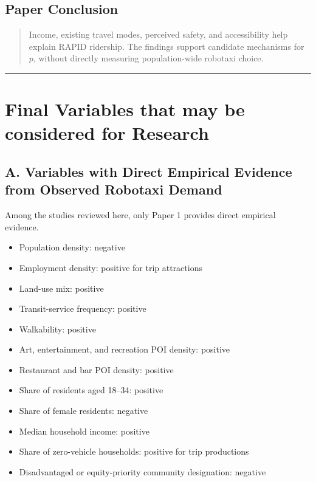 \documentclass[10pt,a4paper]{article}
\providecommand{\tightlist}{\setlength{\itemsep}{0pt}\setlength{\parskip}{0pt}}
\begin{document}
\begin{mdframed}[linecolor=red!60,linewidth=2pt]
\subsection{Paper Conclusion}

\begin{quote}
Income, existing travel modes, perceived safety,
and accessibility help explain RAPID ridership.
The findings support candidate mechanisms for $p$,
without directly measuring population-wide robotaxi choice.
\end{quote}

\end{mdframed}


\begin{center}\rule{0.5\linewidth}{0.5pt}\end{center}

\hypertarget{final-variables-that-may-be-considered-for-research}{%
\section{Final Variables that may be considered for Research}\label{final-variables-that-may-be-considered-for-research}}

\hypertarget{a.-variables-with-direct-empirical-evidence-from-observed-robotaxi-demand}{%
\subsection{A. Variables with Direct Empirical Evidence from Observed Robotaxi Demand}\label{a.-variables-with-direct-empirical-evidence-from-observed-robotaxi-demand}}

Among the studies reviewed here, only Paper 1 provides direct empirical evidence.

\begin{itemize}
\tightlist
\item
  Population density: negative
\item
  Employment density: positive for trip attractions
\item
  Land-use mix: positive
\item
  Transit-service frequency: positive
\item
  Walkability: positive
\item
  Art, entertainment, and recreation POI density: positive
\item
  Restaurant and bar POI density: positive
\item
  Share of residents aged 18--34: positive
\item
  Share of female residents: negative
\item
  Median household income: positive
\item
  Share of zero-vehicle households: positive for trip productions
\item
  Disadvantaged or equity-priority community designation: negative
\end{itemize}
\end{document}
